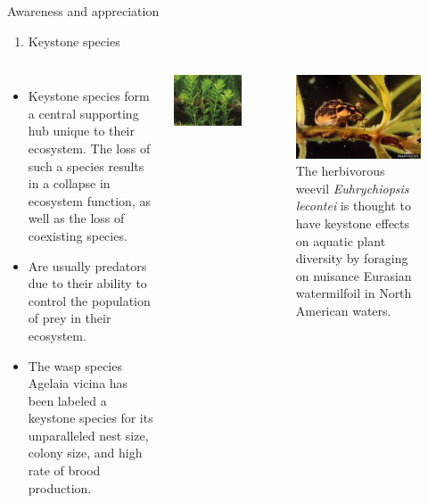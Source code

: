 \documentclass[
  ignorenonframetext,
  aspectratio=169]{beamer}
\providecommand{\tightlist}{%
  \setlength{\itemsep}{0pt}\setlength{\parskip}{0pt}}
\begin{document}
\begin{frame}{Awareness and appreciation}
\protect\hypertarget{awareness-and-appreciation}{}
\footnotesize

\begin{enumerate}
\tightlist
\item
  Keystone species
\end{enumerate}

\begin{columns}[T,onlytextwidth]

  \begin{itemize}
  \item Keystone species form a central supporting hub unique to their ecosystem. The loss of such a species results in a collapse in ecosystem function, as well as the loss of coexisting species.
  \item Are usually predators due to their ability to control the population of prey in their ecosystem.
  \item The wasp species Agelaia vicina has been labeled a keystone species for its unparalleled nest size, colony size, and high rate of brood production.
  \end{itemize}


\includegraphics[width=0.5\linewidth]{../images/myriophyllum-spicatum} 

\begin{figure}
\includegraphics[width=0.5\linewidth]{../images/herbivorus-weevil-euhrychiopsis} \caption{The herbivorous weevil \textit{Euhrychiopsis lecontei} is thought to have keystone effects on aquatic plant diversity by foraging on nuisance Eurasian watermilfoil in North American waters.}\label{fig:keystone-species-beetle-predator}
\end{figure}

\end{columns}
\end{frame}
\end{document}
